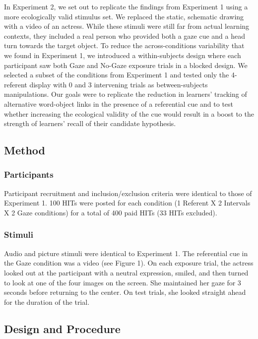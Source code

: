 \documentclass[authoryear, review]{elsarticle}
\begin{document}
In Experiment 2, we set out to replicate the findings from Experiment 1
using a more ecologically valid stimulus set. We replaced the static,
schematic drawing with a video of an actress. While these stimuli were
still far from actual learning contexts, they included a real person who
provided both a gaze cue and a head turn towards the target object. To
reduce the across-conditions variability that we found in Experiment 1,
we introduced a within-subjects design where each participant saw both
Gaze and No-Gaze exposure trials in a blocked design. We selected a
subset of the conditions from Experiment 1 and tested only the
4-referent display with 0 and 3 intervening trials as between-subjects
manipulations. Our goals were to replicate the reduction in learners'
tracking of alternative word-object links in the presence of a
referential cue and to test whether increasing the ecological validity
of the cue would result in a boost to the strength of learners' recall
of their candidate hypothesis.

\subsection{Method}\label{method-1}

\subsubsection{Participants}\label{participants-1}

Participant recruitment and inclusion/exclusion criteria were identical
to those of Experiment 1. 100 HITs were posted for each condition (1
Referent X 2 Intervals X 2 Gaze conditions) for a total of 400 paid HITs
(33 HITs excluded).

\subsubsection{Stimuli}\label{stimuli-1}

Audio and picture stimuli were identical to Experiment 1. The
referential cue in the Gaze condition was a video (see Figure 1). On
each exposure trial, the actress looked out at the participant with a
neutral expression, smiled, and then turned to look at one of the four
images on the screen. She maintained her gaze for 3 seconds before
returning to the center. On test trials, she looked straight ahead for
the duration of the trial.

\subsection{Design and Procedure}\label{design-and-procedure-1}
\end{document}
